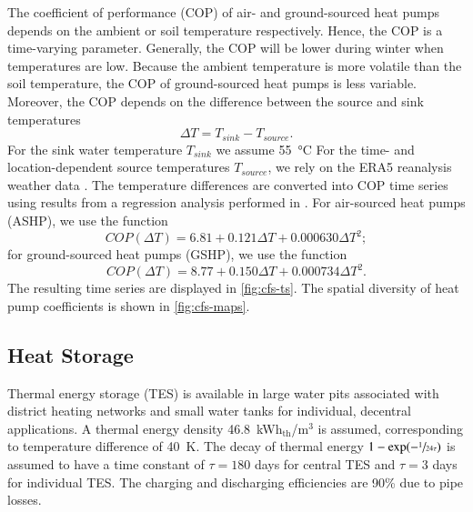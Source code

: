 The coefficient of performance (COP) of air- and ground-sourced heat pumps
depends on the ambient or soil temperature respectively. Hence, the COP is a
time-varying parameter. Generally, the COP will be lower during winter when
temperatures are low. Because the ambient temperature is more volatile than the
soil temperature, the COP of ground-sourced heat pumps is less variable.
Moreover, the COP depends on the difference between the source and sink
temperatures
\begin{equation}
    \Delta T = T_{sink} - T_{source}.
\end{equation}
For the sink water temperature $T_{sink}$ we assume \SI{55}{\celsius} For the
time- and location-dependent source temperatures $T_{source}$, we rely on the
ERA5 reanalysis weather data . The temperature differences are converted
into COP time series using results from a regression analysis performed in
. For air-sourced heat pumps (ASHP), we use
the function
\begin{equation}
    COP(\Delta T) = 6.81 + 0.121 \Delta T + 0.000630 \Delta T^2;
\end{equation}
for ground-sourced heat pumps (GSHP), we use the function
\begin{equation}
    COP(\Delta T) = 8.77 + 0.150 \Delta T + 0.000734 \Delta T^2.
\end{equation}
The resulting time series are displayed in \cref{fig:cfs-ts}.
The spatial diversity of heat pump coefficients is shown in \cref{fig:cfs-maps}.


\subsection{Heat Storage}
\label{sec:si:heat:storage}

Thermal energy storage (TES) is available in large water pits associated with
district heating networks and small water tanks for individual, decentral
applications. A thermal energy density 46.8~kWh$_{\text{th}}$/m$^3$ is assumed,
corresponding to temperature difference of \SI{40}{\kelvin}. The decay of
thermal energy $1-\exp(-\sfrac{1}{24\tau})$ is assumed to have a time constant
of $\tau=180$ days for central TES and $\tau=3$ days for individual TES. The
charging and discharging efficiencies are 90\% due to pipe losses.
